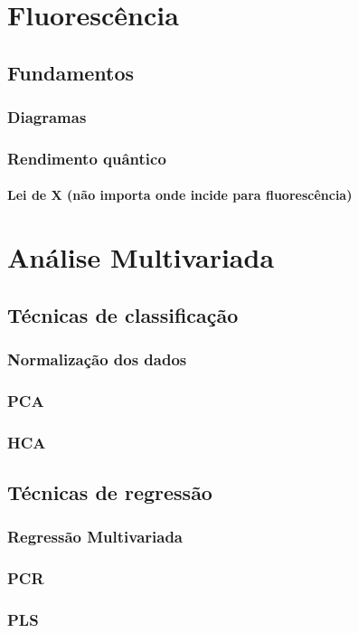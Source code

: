 \documentclass[a4paper, 10pt]{book}
\begin{document}
	\chapter{Fluorescência}
		\section{Fundamentos}
			\subsection{Diagramas}
			\subsection{Rendimento quântico}
			\subsubsection{Lei de X (não importa onde incide para fluorescência)}
	\chapter{Análise Multivariada}
		\section{Técnicas de classificação}
			\subsection{Normalização dos dados}
			\subsection{PCA}
			\subsection{HCA}
		\section{Técnicas de regressão}
			\subsection{Regressão Multivariada}
			\subsection{PCR}
			\subsection{PLS}
\end{document}
